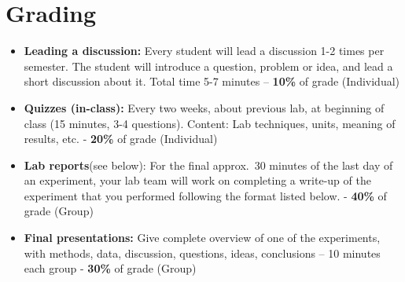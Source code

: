 \section*{Grading}
\begin{itemize}
\item \textbf{ Leading a discussion:} Every student will lead a discussion 1-2 times per semester. The student will introduce a question, problem or idea, and lead a short discussion about it. Total time 5-7 minutes – \textbf{10\%} of grade (Individual)
\item \textbf{Quizzes (in-class):} Every two weeks, about previous lab, at beginning of class (15 minutes, 3-4 questions). Content: Lab techniques, units, meaning of results, etc. - \textbf{20\%} of grade (Individual)
\item \textbf{Lab reports}(see below): For the final approx.\ 30 minutes of the last day of an experiment, your lab team will work on completing a write-up of the experiment that you performed following the format listed below. - \textbf{40\%} of grade (Group)
\item \textbf{Final presentations:} Give complete overview of one of the experiments, with methods, data, discussion, questions, ideas, conclusions – 10 minutes each group - \textbf{30\%} of grade (Group)
\end{itemize}


